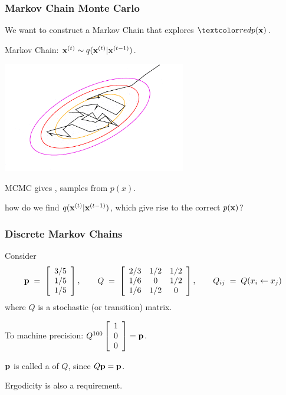 \begin{frame}
\frametitle{Markov Chain Monte Carlo}

We want to construct a Markov Chain that explores $\Red{p(\bfx)}$.

Markov Chain: $\mathbf x^{(t)}\sim q(\mathbf x^{(t)}|\mathbf x^{(t-1)})$.
\begin{center}
\includegraphics[width=0.6\textwidth]{mcmc}
\end{center}
MCMC gives ,  samples from $p(x)$.

 how do we find 
$q(\mathbf x^{(t)}|\mathbf x^{(t-1)})$, which give rise to the correct
 $p(\mathbf x)$?
\end{frame}

\begin{frame}
\frametitle{Discrete Markov Chains}

Consider
\[
{\bf p}\;=\;\left[\begin{array}{c}3/5\\1/5\\1/5\end{array}\right],\qquad
Q\;=\;\left[\begin{array}{ccc}2/3&1/2&1/2\\ 1/6&0&1/2\\ 1/6&1/2&0\end{array}
\right],\qquad
Q_{ij}\;=\;Q(x_i\leftarrow x_j)
\]
where $Q$ is a stochastic (or transition) matrix.

To machine precision: $Q^{100}\left[\begin{array}{c}1\\0\\0\end{array}\right]={\bf p}$.

${\bf p}$ is called a  of $Q$, since $Q{\bf p}={\bf p}$.

Ergodicity is also a requirement. 
\end{frame}

